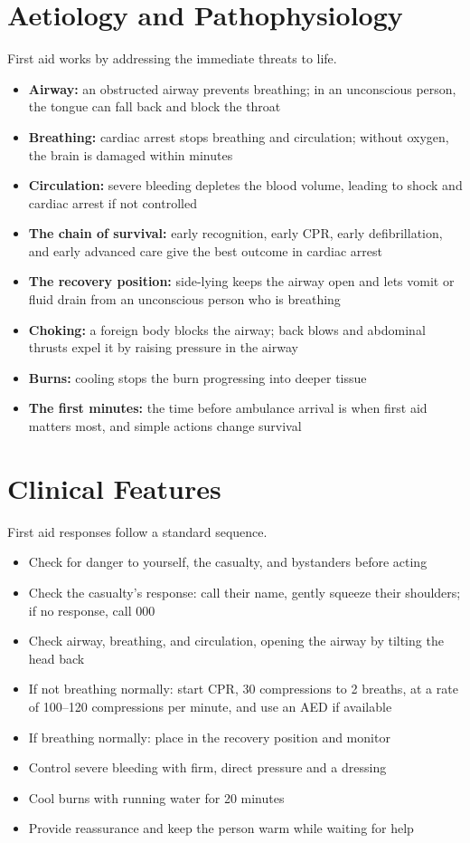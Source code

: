 \section*{Aetiology and Pathophysiology}
First aid works by addressing the immediate threats to life.
\begin{itemize}
    \item \textbf{Airway:} an obstructed airway prevents breathing; in an unconscious person, the tongue can fall back and block the throat
    \item \textbf{Breathing:} cardiac arrest stops breathing and circulation; without oxygen, the brain is damaged within minutes
    \item \textbf{Circulation:} severe bleeding depletes the blood volume, leading to shock and cardiac arrest if not controlled
    \item \textbf{The chain of survival:} early recognition, early CPR, early defibrillation, and early advanced care give the best outcome in cardiac arrest
    \item \textbf{The recovery position:} side-lying keeps the airway open and lets vomit or fluid drain from an unconscious person who is breathing
    \item \textbf{Choking:} a foreign body blocks the airway; back blows and abdominal thrusts expel it by raising pressure in the airway
    \item \textbf{Burns:} cooling stops the burn progressing into deeper tissue
    \item \textbf{The first minutes:} the time before ambulance arrival is when first aid matters most, and simple actions change survival
\end{itemize}

\section*{Clinical Features}
First aid responses follow a standard sequence.
\begin{itemize}
    \item Check for danger to yourself, the casualty, and bystanders before acting
    \item Check the casualty's response: call their name, gently squeeze their shoulders; if no response, call 000
    \item Check airway, breathing, and circulation, opening the airway by tilting the head back
    \item If not breathing normally: start CPR, 30 compressions to 2 breaths, at a rate of 100--120 compressions per minute, and use an AED if available
    \item If breathing normally: place in the recovery position and monitor
    \item Control severe bleeding with firm, direct pressure and a dressing
    \item Cool burns with running water for 20 minutes
    \item Provide reassurance and keep the person warm while waiting for help
\end{itemize}

